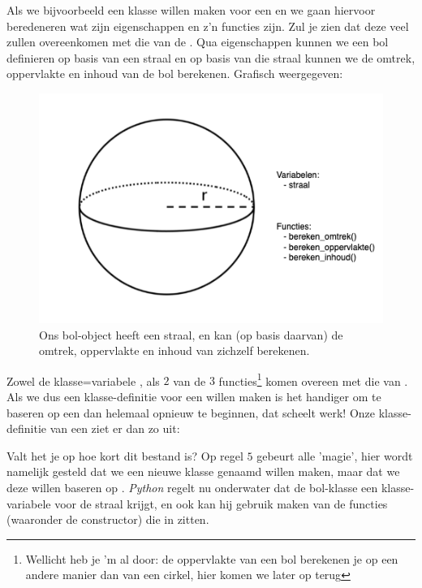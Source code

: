 Als we bijvoorbeeld een klasse willen maken voor een  en we gaan hiervoor beredeneren wat zijn eigenschappen en z'n functies zijn. Zul je zien dat deze veel zullen overeenkomen met die van de . Qua eigenschappen kunnen we een bol definieren op basis van een straal en op basis van die straal kunnen we de omtrek, oppervlakte en inhoud van de bol berekenen. Grafisch weergegeven:
\begin{figure}[h!]
\centering\includegraphics[scale=0.7]{Pictures/chapter08/bol.png}
\caption{Ons bol-object heeft een straal, en kan (op basis daarvan) de omtrek, oppervlakte en inhoud van zichzelf berekenen.}
\label{fig:bol} %
\end{figure}

Zowel de klasse=variabele , als $2$ van de $3$ functies\footnote{Wellicht heb je 'm al door: de oppervlakte van een bol berekenen je op een andere manier dan van een cirkel, hier komen we later op terug} komen overeen met die van . Als we dus een klasse-definitie voor een  willen maken is het handiger om te baseren op een  dan helemaal opnieuw te beginnen, dat scheelt werk! Onze klasse-definitie van een  ziet er dan zo uit:


Valt het je op hoe kort dit bestand is? Op regel $5$ gebeurt alle 'magie', hier wordt namelijk gesteld dat we een nieuwe klasse genaamd  willen maken, maar dat we deze willen baseren op . \textit{Python} regelt nu onderwater dat de bol-klasse een klasse-variabele  voor de straal krijgt, en ook kan hij gebruik maken van de functies (waaronder de constructor) die in  zitten. \newline

